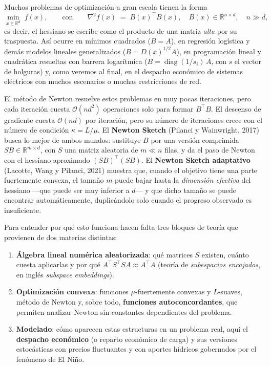\documentclass[11pt,a4paper,oneside]{book}
\theoremstyle{definition}
\theoremstyle{remark}
\newcommand{\R}{\mathbb{R}}
\newcommand{\cO}{\mathcal{O}}
\newcommand{\T}{^{\top}}
\DeclareMathOperator{\diag}{diag}
\begin{document}
Muchos problemas de optimización a gran escala tienen la forma
\begin{equation}\label{eq:problema-general}
  \min_{x\in\R^d}\; f(x), \qquad\text{con}\qquad \nabla^2 f(x) \;=\; B(x)\T B(x),\quad B(x)\in\R^{n\times d},\quad n\gg d,
\end{equation}
es decir, el hessiano se escribe como el producto de una matriz \emph{alta} por su traspuesta.
Así ocurre en mínimos cuadrados ($B=A$), en regresión logística y demás modelos lineales generalizados
($B=D(x)^{1/2}A$), en programación lineal y cuadrática resueltas con barrera logarítmica
($B=\diag(1/s_i)\,A$, con $s$ el vector de holguras) y, como veremos al final, en el despacho económico de
sistemas eléctricos con muchos escenarios o muchas restricciones de red.

El método de Newton resuelve estos problemas en muy pocas iteraciones, pero cada iteración cuesta
$\cO(nd^2)$ operaciones solo para formar $B\T B$. El descenso de gradiente cuesta $\cO(nd)$ por iteración,
pero su número de iteraciones crece con el número de condición $\kappa=L/\mu$. El \textbf{Newton Sketch}
(Pilanci y Wainwright, 2017) busca lo mejor de ambos mundos: sustituye $B$ por una versión comprimida
$SB\in\R^{m\times d}$, con $S$ una matriz aleatoria de $m\ll n$ filas, y da el paso de Newton con el hessiano
aproximado $(SB)\T(SB)$. El \textbf{Newton Sketch adaptativo} (Lacotte, Wang y Pilanci, 2021) muestra que,
cuando el objetivo tiene una parte fuertemente convexa, el tamaño $m$ puede bajar hasta la \emph{dimensión
efectiva} del hessiano ---que puede ser muy inferior a $d$--- y que dicho tamaño se puede encontrar
automáticamente, duplicándolo solo cuando el progreso observado es insuficiente.

Para entender por qué esto funciona hacen falta tres bloques de teoría que provienen de dos materias distintas:
\begin{enumerate}[label=(\roman*)]
  \item \textbf{Álgebra lineal numérica aleatorizada}: qué matrices $S$ existen, cuánto cuesta aplicarlas y
        por qué $A\T S\T S A\approx A\T A$ (teoría de \emph{subespacios encajados}, en inglés
        \emph{subspace embeddings}).
  \item \textbf{Optimización convexa}: funciones $\mu$-fuertemente convexas y $L$-suaves, método de Newton y,
        sobre todo, \textbf{funciones autoconcordantes}, que permiten analizar Newton sin constantes
        dependientes del problema.
  \item \textbf{Modelado}: cómo aparecen estas estructuras en un problema real, aquí el \textbf{despacho
        económico} (o reparto económico de carga) y sus versiones estocásticas con precios fluctuantes y con
        aportes hídricos gobernados por el fenómeno de El Niño.
\end{enumerate}
\end{document}
